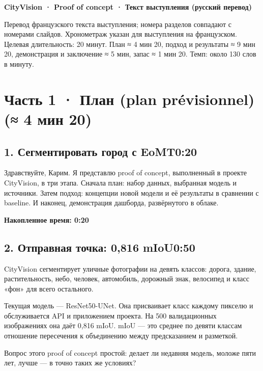 \documentclass[11pt,a4paper]{article}
\newcommand{\cumul}[1]{\par{\hfill\small\color{accent}\bfseries #1}\par}
\newcommand{\tempo}[1]{\hfill{\normalsize\color{accent}#1}}
\begin{document}
\RaggedRight

{\LARGE\bfseries\color{navy}CityVision · Proof of concept · Текст выступления (русский перевод)\par}\vspace{4mm}

Перевод французского текста выступления; номера разделов совпадают с номерами слайдов. Хронометраж указан для выступления на французском.
Целевая длительность: 20 минут. План ≈ 4 мин 20, подход и результаты ≈ 9 мин 20, демонстрация и заключение ≈ 5 мин, запас ≈ 1 мин 20. Темп: около 130 слов в минуту.

\medskip{\color{linec}\rule{\linewidth}{0.5pt}}\medskip

\section*{Часть 1 · План (plan prévisionnel) (≈ 4 мин 20)}

\subsection*{1. Сегментировать город с EoMT\tempo{0:20}}

Здравствуйте, Карим. Я представлю proof of concept, выполненный в проекте CityVision, в три этапа. Сначала план: набор данных, выбранная модель и источники. Затем подход: концепции новой модели и её результаты в сравнении с baseline. И наконец, демонстрация дашборда, развёрнутого в облаке.

\cumul{Накопленное время: 0:20}

\subsection*{2. Отправная точка: 0,816 mIoU\tempo{0:50}}

CityVision сегментирует уличные фотографии на девять классов: дорога, здание, растительность, небо, человек, автомобиль, дорожный знак, велосипед и класс «фон» для всего остального.

Текущая модель — ResNet50-UNet. Она присваивает класс каждому пикселю и обслуживается API и приложением проекта. На 500 валидационных изображениях она даёт 0,816 mIoU. mIoU — это среднее по девяти классам отношение пересечения к объединению между предсказанием и разметкой.

Вопрос этого proof of concept простой: делает ли недавняя модель, моложе пяти лет, лучше — в точно таких же условиях?
\end{document}
